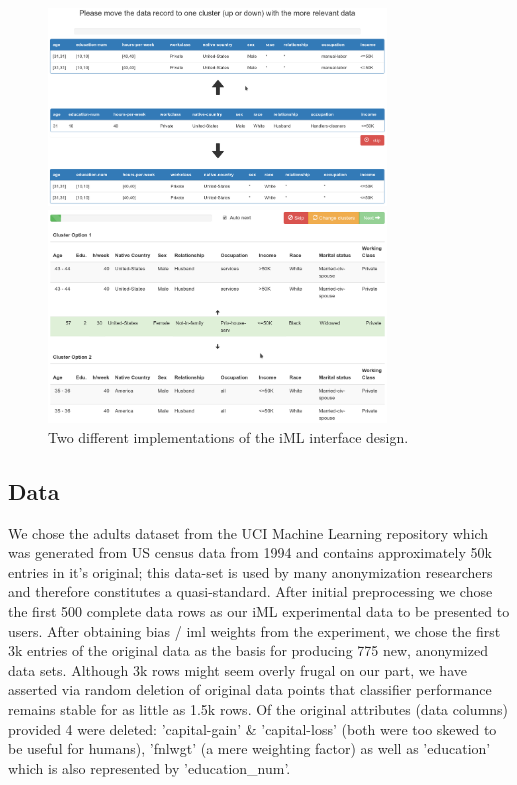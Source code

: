 \documentclass{llncs}
\begin{document}
\begin{figure}[!h]
	\begin{center}
		\vspace{-1.0cm}
		\hspace*{-0.8cm}
		\includegraphics[width=0.8\textwidth]{figures/iml_anon_screen1}
		
		\vspace{0cm}
		\hspace*{-.8cm}
		\includegraphics[width=0.8\textwidth]{figures/iml_anon_screen2}
		\caption{Two different implementations of the iML interface design.}
		\label{fig:iml_UI}
	\end{center}
\end{figure}
\vspace{-0.5cm}


\subsection{Data} 
\label{ssect:data}

We chose the adults dataset from the UCI Machine Learning repository which was generated from US census data from 1994 and contains approximately 50k entries in it's original; this data-set is used by many anonymization researchers and therefore constitutes a quasi-standard. After initial preprocessing we chose the first 500 complete data rows as our iML experimental data to be presented to users. After obtaining bias / iml weights from the experiment, we chose the first 3k entries of the original data as the basis for producing 775 new, anonymized data sets. Although 3k rows might seem overly frugal on our part, we have asserted via random deletion of original data points that classifier performance remains stable for as little as 1.5k rows. Of the original attributes (data columns) provided 4 were deleted: 'capital-gain' \& 'capital-loss' (both were too skewed to be useful for humans), 'fnlwgt' (a mere weighting factor) as well as 'education' which is also represented by 'education\_num'.
\end{document}
